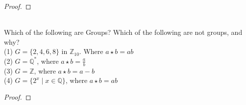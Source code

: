\documentclass[12pt]{article}
\newcommand{\Z}{\mathbb{Z}}
\newcommand{\Q}{\mathbb{Q}}
\newenvironment{problem}[2][Problem]{\begin{trivlist}
\item[\hskip \labelsep {\bfseries #1}\hskip \labelsep {\bfseries #2.}]}{\end{trivlist}}
\begin{document}
\begin{proof}

\end{proof}

\begin{problem}{6}
\text{ }\\
Which of the following are Groups? Which of the following are not groups, and why?\\

\indent (1)  $G = \{{2, 4, 6, 8}\}$ in $\Z_{10}$.  Where $a \star b = ab$\\
\indent (2)  $G = \Q^{\ast}$, where $a \star b = \frac{a}{b}$\\
\indent (3) $G = \Z$, where $a \star b = a - b$\\
\indent (4) $G = \{ {2^{x}\mid x \in \Q} \}$, where $a \star b = ab$\\

\end{problem}
 
\begin{proof}

\end{proof}
\end{document}
